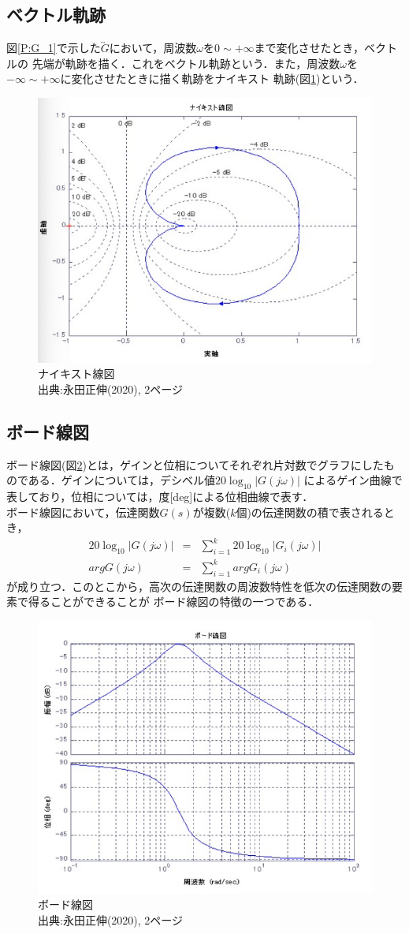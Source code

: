 \documentclass[a4paper,11pt]{jsarticle}
\begin{document}
  \subsection{ベクトル軌跡}
    図\ref{P:G_1}で示した$\overleftrightarrow{G}$において，周波数$\omega$を$0\sim +\infty$まで変化させたとき，ベクトルの
    先端が軌跡を描く．これをベクトル軌跡という．また，周波数$\omega$を$-\infty \sim +\infty$に変化させたときに描く軌跡をナイキスト
    軌跡(図\ref{P:G_2})という．
    \begin{figure}[H]
      \centering
      \includegraphics[width=0.5\linewidth]{picture/G_2.png}
      \caption{ナイキスト線図\\出典:永田正伸(2020), 2ページ\cite{text}}
      \label{P:G_2}
    \end{figure}

  \subsection{ボード線図}
    ボード線図(図\ref{P:G_3})とは，ゲインと位相についてそれぞれ片対数でグラフにしたものである．ゲインについては，デシベル値$20\log_{10}|G(j\omega)|$
    によるゲイン曲線で表しており，位相については，度[deg]による位相曲線で表す．\\
    ボード線図において，伝達関数$G(s)$が複数($k$個)の伝達関数の積で表されるとき，
    \begin{eqnarray}
      20\log_{10}|G(j\omega)| &=& \sum_{i=1}^{k}20\log_{10}|G_i(j\omega)| \\
      argG(j\omega) &=& \sum_{i=1}^{k}argG_i(j\omega)
    \end{eqnarray}
    が成り立つ．このとこから，高次の伝達関数の周波数特性を低次の伝達関数の要素で得ることができることが
    ボード線図の特徴の一つである．
    \begin{figure}[H]
      \centering
      \includegraphics[width=0.5\linewidth]{picture/G_3.png}
      \caption{ボード線図\\出典:永田正伸(2020), 2ページ\cite{text}}
      \label{P:G_3}
    \end{figure}
\end{document}
